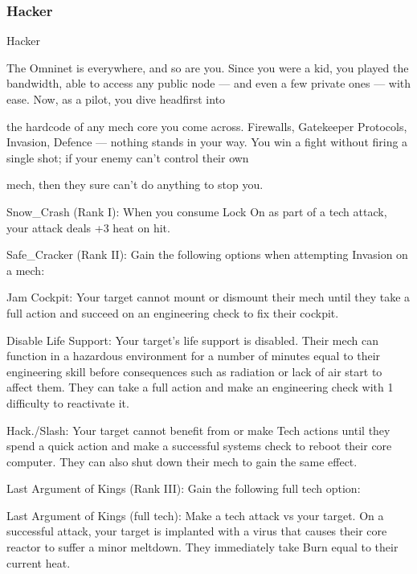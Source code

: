 \subsubsection{Hacker}

                                                     Hacker

The Omninet is everywhere, and so are you. Since you were a kid, you played the bandwidth, able to
access any public node — and even a few private ones — with ease. Now, as a pilot, you dive headfirst into

the hardcode of any mech core you come across. Firewalls, Gatekeeper Protocols, Invasion, Defence —
nothing stands in your way. You win a fight without firing a single shot; if your enemy can’t control their own

mech, then they sure can’t do anything to stop you.

Snow\_Crash (Rank I): When you consume Lock On as part of a tech attack, your attack deals
+3 heat on hit.

Safe\_Cracker (Rank II): Gain the following options when attempting Invasion on a mech:

         Jam Cockpit: Your target cannot mount or dismount their mech until they take a full
         action and succeed on an engineering check to fix their cockpit.

         Disable Life Support: Your target’s life support is disabled. Their mech can function in a
         hazardous environment for a number of minutes equal to their engineering skill before
         consequences such as radiation or lack of air start to affect them. They can take a full
         action and make an engineering check with 1 difficulty to reactivate it.

         Hack./Slash: Your target cannot benefit from or make Tech actions until they spend a
         quick action and make a successful systems check to reboot their core computer. They
         can also shut down their mech to gain the same effect.

Last Argument of Kings (Rank III): Gain the following full tech option:

	        Last Argument of Kings (full tech): Make a tech attack vs your target. On a successful
attack, your target is implanted with a virus that causes their core reactor to suffer a minor
meltdown. They immediately take Burn equal to their current heat.
